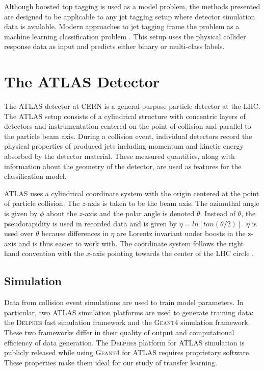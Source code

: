 Although boosted top tagging is used as a model problem, the methods presented are designed to be applicable to any jet tagging setup where detector simulation data is available. Modern approaches to jet tagging frame the problem as a machine learning classification problem \cite{ATL-PHYS-PUB-2022-039}. This setup uses the physical collider response data as input and predicts either binary or multi-class labels.

\section{The ATLAS Detector}

The ATLAS detector at CERN is a general-purpose particle detector at the LHC. The ATLAS setup consists of a cylindrical structure with concentric layers of detectors and instrumentation centered on the point of collision and parallel to the particle beam axis. During a collision event, individual detectors record the physical properties of produced jets including momentum and kinetic energy absorbed by the detector material. These measured quantities, along with information about the geometry of the detector, are used as features for the classification model.

ATLAS uses a cylindrical coordinate system with the origin centered at the point of particle collision. The $z$-axis is taken to be the beam axis. The azimuthal angle is given by $\phi$ about the $z$-axis and the polar angle is denoted $\theta$. Instead of $\theta$, the pseudorapidity is used in recorded data and is given by $\eta = ln\left[tan\left(\theta / 2\right)\right]$. $\eta$ is used over $\theta$ because differences in $\eta$ are Lorentz invariant under boosts in the z-axis and is thus easier to work with. The coordinate system follows the right hand convention with the $x$-axis pointing towards the center of the LHC circle \cite{Aad:1129811}.

\subsection{Simulation}

Data from collision event simulations are used to train model parameters. In particular, two ATLAS simulation platforms are used to generate training data: the \textsc{Delphes} \cite{de_Favereau_2014} fast simulation framework and the \textsc{Geant4} \cite{AGOSTINELLI2003250,1610988,ALLISON2016186} simulation framework. These two frameworks differ in their quality of output and computational efficiency of data generation. The \textsc{Delphes} platform for ATLAS simulation is publicly released while using \textsc{Geant4} for ATLAS requires proprietary software. These properties make them ideal for our study of transfer learning.

